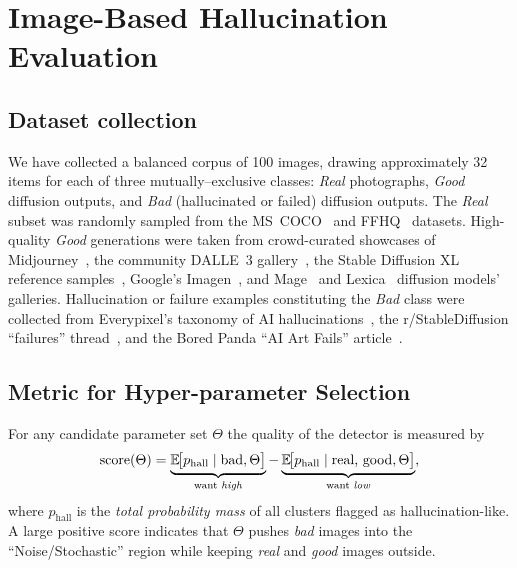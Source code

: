 \documentclass{article}
\begin{document}
\section{Image-Based Hallucination Evaluation}
\label{sec:image_module}

\subsection{Dataset collection}
We have collected a balanced corpus of 100 images, drawing approximately 32 items for each of three mutually–exclusive classes: \emph{Real} photographs, \emph{Good} diffusion outputs, and \emph{Bad} (hallucinated or failed) diffusion outputs.\citep{Lin2014COCO,MidjourneyWebsite}
The \emph{Real} subset was randomly sampled from the MS~COCO~\citep{Lin2014COCO} and FFHQ~\citep{Karras2019FFHQ} datasets.
High-quality \emph{Good} generations were taken from crowd-curated showcases of Midjourney~\citep{MidjourneyWebsite}, the community DALL\textperiodcentered E~3 gallery~\citep{DALLE3Gallery}, the Stable Diffusion XL reference samples~\citep{Podell2023SDXL}, Google’s Imagen~\citep{Saharia2022Imagen}, and Mage~\citep{MageSpace} and Lexica~\citep{LexicaArt} diffusion models' galleries.
Hallucination or failure examples constituting the \emph{Bad} class were collected from Everypixel’s taxonomy of AI hallucinations~\citep{EverypixelHalluc}, the r/StableDiffusion ``failures'' thread~\citep{RedditStableFail}, and the Bored Panda ``AI Art Fails'' article~\citep{BoredPandaFails}.

\subsection{Metric for Hyper-parameter Selection}
For any candidate parameter set \(\Theta\) the quality of the detector
is measured by
\begin{equation}
\label{eq:hall_score}
\text{score}(\Theta)=
\underbrace{\mathbb{E}\!\bigl[p_{\mathrm{hall}}\mid{\text{bad}},
\Theta\bigr]}_{\text{want \emph{high}}}
-
\underbrace{\mathbb{E}\!\bigl[p_{\mathrm{hall}}\mid
{\text{real, good}},\Theta\bigr]}_{\text{want \emph{low}}},
\end{equation}
where \(p_{\mathrm{hall}}\) is the \emph{total probability mass} of all
clusters flagged as hallucination-like.  A
large positive score indicates that \(\Theta\) pushes \emph{bad} images
into the ``Noise/Stochastic'' region while keeping \emph{real} and
\emph{good} images outside.
\end{document}
